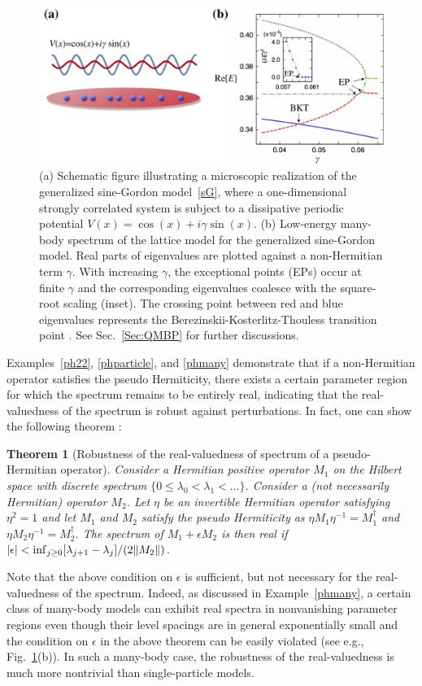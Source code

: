 \documentclass{tADP2e}
\theoremstyle{plain}
\theoremstyle{plain}
\newtheorem{theorem}{Theorem}[section]
\theoremstyle{definition}
\begin{document}
\begin{figure}
\begin{center}
\includegraphics[width=12cm]{./Figures/fig_2_ashida_NC.pdf}
\end{center}
\caption{(a) Schematic figure illustrating a microscopic realization of the generalized sine-Gordon model~\eqref{sG}, where a one-dimensional strongly correlated system is subject to a dissipative periodic potential $V(x)=\cos(x)+i\gamma\sin(x)$. (b) Low-energy many-body spectrum of the lattice model for the generalized sine-Gordon model. Real parts of eigenvalues are plotted against a non-Hermitian term $\gamma$. With increasing $\gamma$, the exceptional points (EPs) occur at finite $\gamma$ and the corresponding eigenvalues coalesce with the square-root scaling (inset). The crossing point between red and blue eigenvalues represents the Berezinskii-Kosterlitz-Thouless transition point  \cite{YA17nc}. See Sec.~\ref{Sec:QMBP} for further discussions.}
\label{fig:2ashida_NC}
\end{figure}

Examples~\ref{ph22}, \ref{phparticle}, and \ref{phmany} demonstrate that if a non-Hermitian operator satisfies the pseudo Hermiticity, there exists a certain parameter region for which the spectrum remains to be entirely real, indicating that the real-valuedness of the spectrum is robust against perturbations. In fact, one can show the following theorem \cite{EC04}:

\begin{theorem}[Robustness of the real-valuedness of spectrum of a pseudo-Hermitian operator]
Consider a Hermitian positive operator $M_1$ on the Hilbert space with discrete spectrum $\{0\leq\lambda_0<\lambda_1<\ldots\}$. Consider a (not necessarily Hermitian) operator $M_2$. Let $\eta$ be an invertible Hermitian operator satisfying $\eta^2=1$ and let $M_1$ and $M_2$ satisfy the pseudo Hermiticity as $\eta M_1\eta^{-1}=M_1^\dagger$ and $\eta M_2\eta^{-1}=M_2^\dagger$. The spectrum of $M_1+\epsilon M_2$ is then real if $|\epsilon|<{\rm inf}_{j\geq0}[\lambda_{j+1}-\lambda_j]/(2\|M_2\|)$.
\end{theorem}
Note that the above condition on $\epsilon$ is sufficient, but not necessary for the real-valuedness of the spectrum. Indeed, as discussed in Example~\ref{phmany}, a certain class of many-body models can exhibit real spectra in nonvanishing parameter regions even though their level spacings are in general exponentially small and the condition on $\epsilon$ in the above theorem can be easily violated (see e.g., Fig.~\ref{fig:2ashida_NC}(b)). In such a many-body case, the robustness of the real-valuedness is much more nontrivial than single-particle models. 
 
\end{document}
